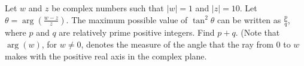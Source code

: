 Let $w$ and $z$ be complex numbers such that $|w| = 1$ and $|z| = 10$. Let $\theta = \arg\left(\tfrac{w-z}{z}\right)$. The maximum possible value of $\tan^2 \theta$ can be written as $\tfrac{p}{q}$, where $p$ and $q$ are relatively prime positive integers. Find $p+q$. (Note that $\arg(w)$, for $w \neq 0$, denotes the measure of the angle that the ray from $0$ to $w$ makes with the positive real axis in the complex plane.